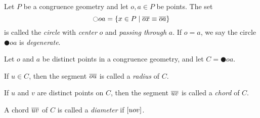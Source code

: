 \begin{dfn}[Circle]
Let \(P\) be a congruence geometry and let \(o,a \in P\) be points.
The set \[ \ocircle{oa} = \{ x \in P \mid \overline{ox} \equiv \overline{oa} \} \] is called the \emph{circle} with \emph{center} \(o\) and \emph{passing through} \(a\).
If \(o = a\), we say the circle \(\CIRCLE{o}{a}\) is \emph{degenerate}.
\end{dfn}


\begin{dfn}
Let \(o\) and \(a\) be distinct points in a congruence geometry, and let \(C = \CIRCLE{o}{a}\).
\begin{proplist}
\item If \(u \in C\), then the segment \(\overline{ou}\) is called a \emph{radius} of \(C\).
\item If \(u\) and \(v\) are distinct points on \(C\), then the segment \(\overline{uv}\) is called a \emph{chord} of \(C\).
\item A chord \(\overline{uv}\) of \(C\) is called a \emph{diameter} if \([ u o v ]\).
\end{proplist}
\end{dfn}
